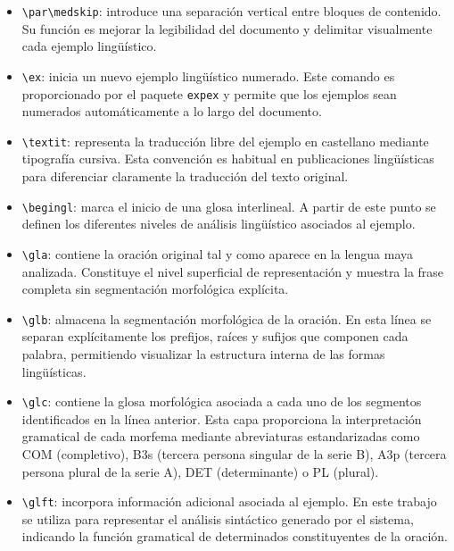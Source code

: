 \begin{itemize}

\item \texttt{\textbackslash par\textbackslash medskip}: introduce una separación vertical entre bloques de contenido. Su función es mejorar la legibilidad del documento y delimitar visualmente cada ejemplo lingüístico.

\item \texttt{\textbackslash ex}: inicia un nuevo ejemplo lingüístico numerado. Este comando es proporcionado por el paquete \texttt{expex} y permite que los ejemplos sean numerados automáticamente a lo largo del documento.

\item \texttt{\textbackslash textit{}}: representa la traducción libre del ejemplo en castellano mediante tipografía cursiva. Esta convención es habitual en publicaciones lingüísticas para diferenciar claramente la traducción del texto original.

\item \texttt{\textbackslash begingl}: marca el inicio de una glosa interlineal. A partir de este punto se definen los diferentes niveles de análisis lingüístico asociados al ejemplo.

\item \texttt{\textbackslash gla}: contiene la oración original tal y como aparece en la lengua maya analizada. Constituye el nivel superficial de representación y muestra la frase completa sin segmentación morfológica explícita.

\item \texttt{\textbackslash glb}: almacena la segmentación morfológica de la oración. En esta línea se separan explícitamente los prefijos, raíces y sufijos que componen cada palabra, permitiendo visualizar la estructura interna de las formas lingüísticas.

\item \texttt{\textbackslash glc}: contiene la glosa morfológica asociada a cada uno de los segmentos identificados en la línea anterior. Esta capa proporciona la interpretación gramatical de cada morfema mediante abreviaturas estandarizadas como COM (completivo), B3s (tercera persona singular de la serie B), A3p (tercera persona plural de la serie A), DET (determinante) o PL (plural).

\item \texttt{\textbackslash glft}: incorpora información adicional asociada al ejemplo. En este trabajo se utiliza para representar el análisis sintáctico generado por el sistema, indicando la función gramatical de determinados constituyentes de la oración.


\end{itemize}
